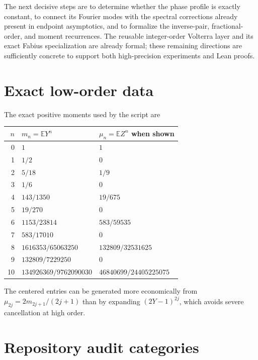 \documentclass[11pt,oneside]{article}
\theoremstyle{definition}
\newcommand{\E}{\mathbb E}
\begin{document}
The next decisive steps are to determine whether the phase profile is exactly constant,
to connect its Fourier modes with the spectral corrections already present in endpoint
asymptotics, and to formalize the inverse-pair, fractional-order, and moment recurrences.
The reusable integer-order Volterra layer and its exact Fabius specialization are already
formal; these remaining directions are sufficiently concrete to support both
high-precision experiments and Lean proofs.

\appendix

\section{Exact low-order data}

The exact positive moments used by the script are
\begin{longtable}{@{}rll@{}}
\toprule
\(n\)&\(m_n=\E Y^n\)&\(\mu_n=\E Z^n\) when shown\\
\midrule
0&\(1\)&\(1\)\\
1&\(1/2\)&\(0\)\\
2&\(5/18\)&\(1/9\)\\
3&\(1/6\)&\(0\)\\
4&\(143/1350\)&\(19/675\)\\
5&\(19/270\)&\(0\)\\
6&\(1153/23814\)&\(583/59535\)\\
7&\(583/17010\)&\(0\)\\
8&\(1616353/65063250\)&\(132809/32531625\)\\
9&\(132809/7229250\)&\(0\)\\
10&\(134926369/9762090030\)&\(46840699/24405225075\)\\
\bottomrule
\end{longtable}
The centered entries can be generated more economically from
\(\mu_{2j}=2m_{2j+1}/(2j+1)\) than by expanding \((2Y-1)^{2j}\), which avoids severe
cancellation at high order.

\section{Repository audit categories}
\end{document}

